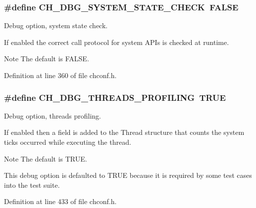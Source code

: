 \subsubsection[{C\+H\+\_\+\+D\+B\+G\+\_\+\+S\+Y\+S\+T\+E\+M\+\_\+\+S\+T\+A\+T\+E\+\_\+\+C\+H\+E\+C\+K}]{\setlength{\rightskip}{0pt plus 5cm}\#define C\+H\+\_\+\+D\+B\+G\+\_\+\+S\+Y\+S\+T\+E\+M\+\_\+\+S\+T\+A\+T\+E\+\_\+\+C\+H\+E\+C\+K~F\+A\+L\+S\+E}\label{group__config_ga10db71bc25605169dddc82c1604b0a16}


Debug option, system state check. 

If enabled the correct call protocol for system A\+P\+Is is checked at runtime.

\begin{DoxyNote}{Note}
The default is {\ttfamily F\+A\+L\+S\+E}. 
\end{DoxyNote}


Definition at line 360 of file chconf.\+h.

\hypertarget{group__config_gadc9c00c2e5b6e766ded8dfa77c0c90c1}{}
\subsubsection[{C\+H\+\_\+\+D\+B\+G\+\_\+\+T\+H\+R\+E\+A\+D\+S\+\_\+\+P\+R\+O\+F\+I\+L\+I\+N\+G}]{\setlength{\rightskip}{0pt plus 5cm}\#define C\+H\+\_\+\+D\+B\+G\+\_\+\+T\+H\+R\+E\+A\+D\+S\+\_\+\+P\+R\+O\+F\+I\+L\+I\+N\+G~T\+R\+U\+E}\label{group__config_gadc9c00c2e5b6e766ded8dfa77c0c90c1}


Debug option, threads profiling. 

If enabled then a field is added to the {\ttfamily Thread} structure that counts the system ticks occurred while executing the thread.

\begin{DoxyNote}{Note}
The default is {\ttfamily T\+R\+U\+E}. 

This debug option is defaulted to T\+R\+U\+E because it is required by some test cases into the test suite. 
\end{DoxyNote}


Definition at line 433 of file chconf.\+h.

